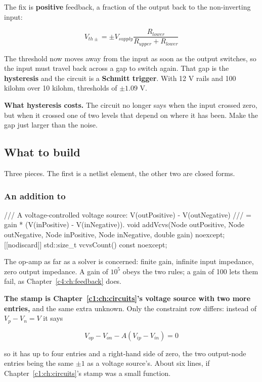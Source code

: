 The fix is \textbf{positive} feedback, a fraction of the output back to the non-inverting input:

\[
  V_{th\pm} = \pm V_{supply} \frac{R_{lower}}{R_{upper} + R_{lower}}
\]

The threshold now moves away from the input as soon as the output switches, so the input must travel back across a gap to switch again. That gap is the \textbf{hysteresis} and the circuit is a \textbf{Schmitt trigger}. With 12 V rails and 100 kilohm over 10 kilohm, thresholds of $\pm 1.09$ V.

\textbf{What hysteresis costs.} The circuit no longer says when the input crossed zero, but when it crossed one of two levels that depend on where it has been. Make the gap just larger than the noise.

\subsection{What to build}
\label{c3:sec:b5}
Three pieces. The first is a netlist element, the other two are closed forms.

\subsubsection{An addition to }
\begin{cppcode}
/// A voltage-controlled voltage source: V(outPositive) - V(outNegative)
///                                    = gain * (V(inPositive) - V(inNegative)).
void addVcvs(Node outPositive, Node outNegative, Node inPositive, Node inNegative, double gain) noexcept;
[[nodiscard]] std::size_t vcvsCount() const noexcept;
\end{cppcode}

The op-amp as far as a solver is concerned: finite gain, infinite input impedance, zero output impedance. A gain of $10^5$ obeys the two rules; a gain of 100 lets them fail, as Chapter~\ref{c4:ch:feedback} does.

\textbf{The stamp is Chapter~\ref{c1:ch:circuits}'s voltage source with two more entries,} and the same extra unknown. Only the constraint row differs: instead of $V_p - V_n = V$ it says

\[
  V_{op} - V_{on} - A(V_{ip} - V_{in}) = 0
\]

so it has up to four entries and a right-hand side of zero, the two output-node entries being the same $\pm 1$ as a voltage source's. About six lines, if Chapter~\ref{c1:ch:circuits}'s stamp was a small function.

